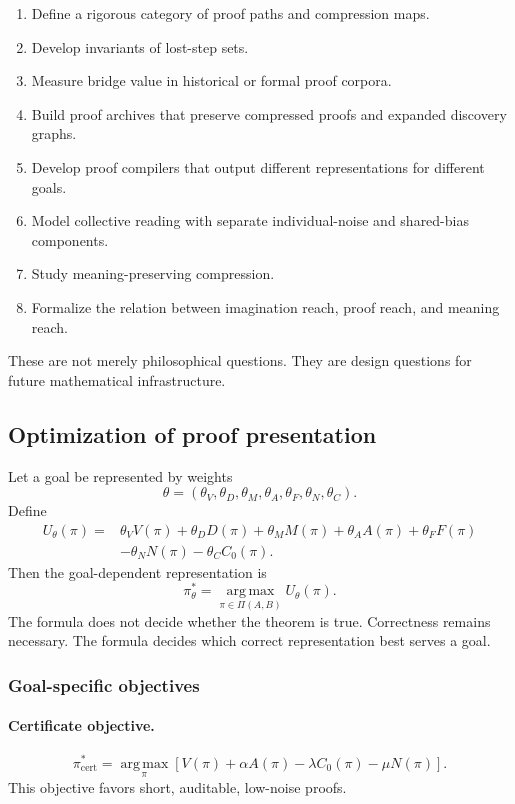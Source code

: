 \documentclass[11pt]{article}
\theoremstyle{definition}
\theoremstyle{remark}
\begin{document}
\begin{enumerate}[label=(\arabic*)]
\item Define a rigorous category of proof paths and compression maps.
\item Develop invariants of lost-step sets.
\item Measure bridge value in historical or formal proof corpora.
\item Build proof archives that preserve compressed proofs and expanded discovery graphs.
\item Develop proof compilers that output different representations for different goals.
\item Model collective reading with separate individual-noise and shared-bias components.
\item Study meaning-preserving compression.
\item Formalize the relation between imagination reach, proof reach, and meaning reach.
\end{enumerate}

These are not merely philosophical questions.  They are design questions for future mathematical infrastructure.

\subsection{Optimization of proof presentation}

Let a goal be represented by weights
\[
        \theta=(\theta_V,\theta_D,\theta_M,\theta_A,\theta_F,\theta_N,\theta_C).
\]
Define
\[
\begin{aligned}
        U_\theta(\pi)
        ={}&\theta_VV(\pi)+\theta_DD(\pi)+\theta_MM(\pi)
        +\theta_AA(\pi)+\theta_FF(\pi)\\
        &-\theta_NN(\pi)-\theta_CC_0(\pi).
\end{aligned}
\]
Then the goal-dependent representation is
\[
        \pi_\theta^*=
        \operatorname*{arg\,max}_{\pi\in\Pi(A,B)}U_\theta(\pi).
\]
The formula does not decide whether the theorem is true.  Correctness remains necessary.  The formula decides which correct representation best serves a goal.

\subsubsection{Goal-specific objectives}

\paragraph{Certificate objective.}
\[
        \pi^*_{\mathrm{cert}}
        =\operatorname*{arg\,max}_\pi
        \left[V(\pi)+\alpha A(\pi)-\lambda C_0(\pi)-\mu N(\pi)\right].
\]
This objective favors short, auditable, low-noise proofs.
\end{document}
